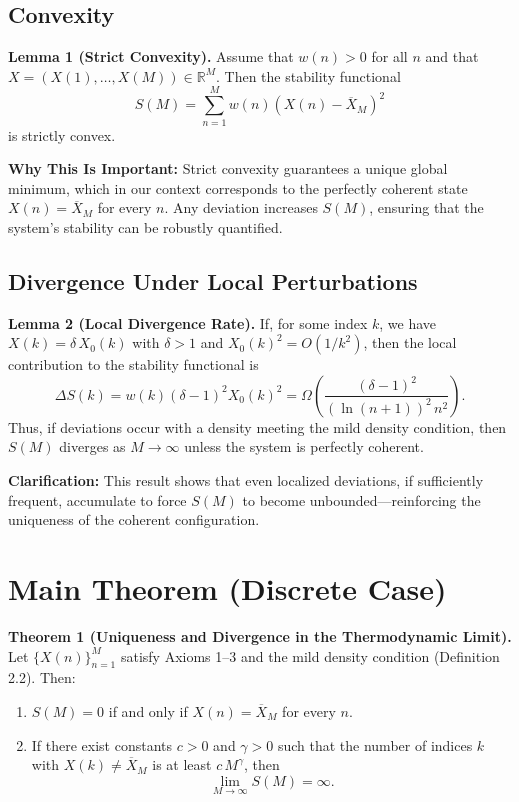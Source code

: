 \documentclass[11pt]{article}
\begin{document}
\subsection{Convexity}

\textbf{Lemma 1 (Strict Convexity).} Assume that $w(n)>0$ for all $n$ and that $X=(X(1),\dots,X(M)) \in \mathbb{R}^M$. Then the stability functional
\[
S(M)=\sum_{n=1}^M w(n) \left(X(n)-\overline{X}_M\right)^2
\]
is strictly convex.

\textbf{Why This Is Important:} Strict convexity guarantees a unique global minimum, which in our context corresponds to the perfectly coherent state $X(n)=\overline{X}_M$ for every $n$. Any deviation increases $S(M)$, ensuring that the system's stability can be robustly quantified.

\subsection{Divergence Under Local Perturbations}

\textbf{Lemma 2 (Local Divergence Rate).} If, for some index $k$, we have $X(k)=\delta\,X_0(k)$ with $\delta>1$ and $X_0(k)^2=O(1/k^2)$, then the local contribution to the stability functional is
\[
\Delta S(k)=w(k)(\delta-1)^2 X_0(k)^2 = \Omega\left(\frac{(\delta-1)^2}{\left(\ln(n+1)\right)^2\, n^2}\right).
\]
Thus, if deviations occur with a density meeting the mild density condition, then $S(M)$ diverges as $M\to\infty$ unless the system is perfectly coherent.

\textbf{Clarification:} This result shows that even localized deviations, if sufficiently frequent, accumulate to force $S(M)$ to become unbounded---reinforcing the uniqueness of the coherent configuration.

\section{Main Theorem (Discrete Case)}

\textbf{Theorem 1 (Uniqueness and Divergence in the Thermodynamic Limit).} Let $\{X(n)\}_{n=1}^M$ satisfy Axioms 1--3 and the mild density condition (Definition 2.2). Then:
\begin{enumerate}
    \item $S(M)=0$ if and only if $X(n)=\overline{X}_M$ for every $n$.
    \item If there exist constants $c>0$ and $\gamma>0$ such that the number of indices $k$ with $X(k) \neq \overline{X}_M$ is at least $c\,M^{\gamma}$, then
    \[
    \lim_{M\to\infty} S(M)=\infty.
    \]
\end{enumerate}
\end{document}

